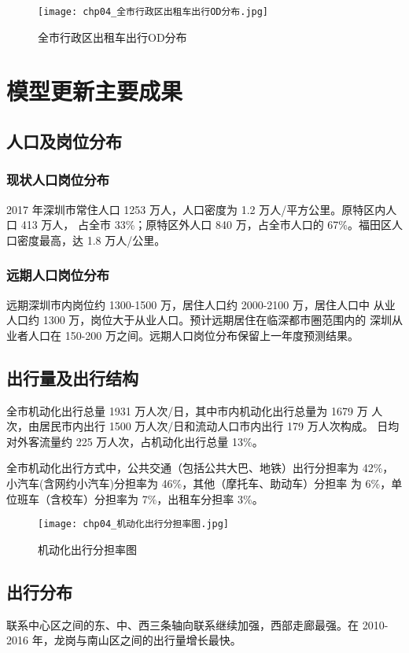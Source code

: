 \begin{figure}[!ht]
  \centering
  \texttt{[image: chp04\_全市行政区出租车出行OD分布.jpg]}
  \caption{全市行政区出租车出行OD分布\label{fig:chp04_全市行政区出租车出行OD分布} }
\end{figure}

\section{模型更新主要成果}
\subsection{人口及岗位分布}
\subsubsection{现状人口岗位分布}
2017 年深圳市常住人口 1253 万人，人口密度为 1.2 万人/平方公里。原特区内人口 413 万人，
占全市 33\%；原特区外人口 840 万，占全市人口的 67\%。福田区人口密度最高，达 1.8 万人/公里。

\subsubsection{远期人口岗位分布}
远期深圳市内岗位约 1300-1500 万，居住人口约 2000-2100 万，居住人口中
从业人口约 1300 万，岗位大于从业人口。预计远期居住在临深都市圈范围内的
深圳从业者人口在 150-200 万之间。远期人口岗位分布保留上一年度预测结果。

\subsection{出行量及出行结构}
全市机动化出行总量 1931 万人次/日，其中市内机动化出行总量为 1679 万
人次，由居民市内出行 1500 万人次/日和流动人口市内出行 179 万人次构成。
日均对外客流量约 225 万人次，占机动化出行总量 13\%。

全市机动化出行方式中，公共交通（包括公共大巴、地铁）出行分担率为
42\%，小汽车(含网约小汽车)分担率为 46\%，其他（摩托车、助动车）分担率
为 6\%，单位班车（含校车）分担率为 7\%，出租车分担率 3\%。

\begin{figure}[!ht]
  \centering
  \texttt{[image: chp04\_机动化出行分担率图.jpg]}
  \caption{机动化出行分担率图\label{fig:chp04_机动化出行分担率图} }
\end{figure}

\subsection{出行分布}
联系中心区之间的东、中、西三条轴向联系继续加强，西部走廊最强。在
2010-2016 年，龙岗与南山区之间的出行量增长最快。

